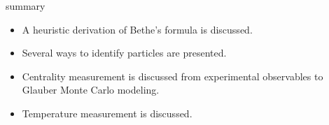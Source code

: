 \documentclass{beamer}
\begin{document}
\begin{frame}{summary}
  \begin{itemize}
    \item A heuristic derivation of Bethe's formula is discussed.
    \item Several ways to identify particles are presented.
    \item Centrality measurement is discussed from experimental observables to Glauber Monte Carlo modeling.
    \item Temperature measurement is discussed.
  \end{itemize}
\end{frame}
\end{document}
